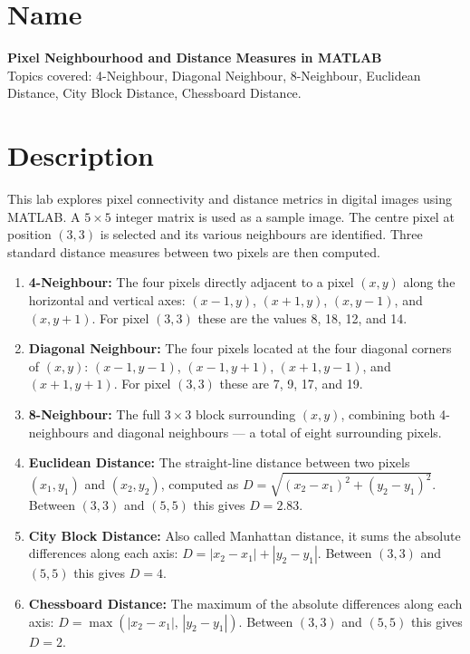 \documentclass[12pt,a4paper]{article}
\begin{document}

\section{Name}

\textbf{Pixel Neighbourhood and Distance Measures in MATLAB}\\[0.3em]
Topics covered: 4-Neighbour, Diagonal Neighbour, 8-Neighbour,
Euclidean Distance, City Block Distance, Chessboard Distance.


\section{Description}

This lab explores pixel connectivity and distance metrics in digital images
using MATLAB. A $5 \times 5$ integer matrix is used as a sample image.
The centre pixel at position $(3,3)$ is selected and its various neighbours
are identified. Three standard distance measures between two pixels are then
computed.

\begin{enumerate}
  \item \textbf{4-Neighbour:} The four pixels directly adjacent to a pixel
        $(x,y)$ along the horizontal and vertical axes: $(x-1,y)$,
        $(x+1,y)$, $(x,y-1)$, and $(x,y+1)$. For pixel $(3,3)$ these are
        the values 8, 18, 12, and 14.

  \item \textbf{Diagonal Neighbour:} The four pixels located at the four
        diagonal corners of $(x,y)$: $(x-1,y-1)$, $(x-1,y+1)$,
        $(x+1,y-1)$, and $(x+1,y+1)$. For pixel $(3,3)$ these are
        7, 9, 17, and 19.

  \item \textbf{8-Neighbour:} The full $3\times3$ block surrounding $(x,y)$,
        combining both 4-neighbours and diagonal neighbours — a total of
        eight surrounding pixels.

  \item \textbf{Euclidean Distance:} The straight-line distance between two
        pixels $(x_1,y_1)$ and $(x_2,y_2)$, computed as
        $D = \sqrt{(x_2-x_1)^2 + (y_2-y_1)^2}$.
        Between $(3,3)$ and $(5,5)$ this gives $D = 2.83$.

  \item \textbf{City Block Distance:} Also called Manhattan distance, it sums
        the absolute differences along each axis:
        $D = |x_2-x_1| + |y_2-y_1|$.
        Between $(3,3)$ and $(5,5)$ this gives $D = 4$.

  \item \textbf{Chessboard Distance:} The maximum of the absolute differences
        along each axis: $D = \max(|x_2-x_1|,\, |y_2-y_1|)$.
        Between $(3,3)$ and $(5,5)$ this gives $D = 2$.
\end{enumerate}
\end{document}
